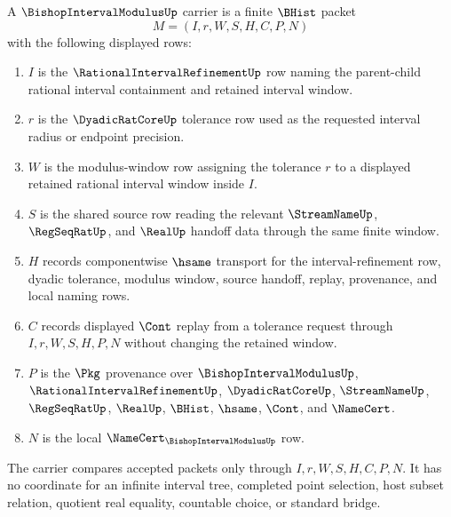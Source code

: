 \begin{definition}
\label{def:bishop-interval-modulus-carrier}
A $\BishopIntervalModulusUp$ carrier is a finite $\BHist$ packet
$$
M=(I,r,W,S,H,C,P,N)
$$
with the following displayed rows:
\begin{enumerate}
\item $I$ is the $\RationalIntervalRefinementUp$ row naming the parent-child rational interval containment and retained interval window.
\item $r$ is the $\DyadicRatCoreUp$ tolerance row used as the requested interval radius or endpoint precision.
\item $W$ is the modulus-window row assigning the tolerance $r$ to a displayed retained rational interval window inside $I$.
\item $S$ is the shared source row reading the relevant $\StreamNameUp$, $\RegSeqRatUp$, and $\RealUp$ handoff data through the same finite window.
\item $H$ records componentwise $\hsame$ transport for the interval-refinement row, dyadic tolerance, modulus window, source handoff, replay, provenance, and local naming rows.
\item $C$ records displayed $\Cont$ replay from a tolerance request through $I,r,W,S,H,P,N$ without changing the retained window.
\item $P$ is the $\Pkg$ provenance over $\BishopIntervalModulusUp$, $\RationalIntervalRefinementUp$, $\DyadicRatCoreUp$, $\StreamNameUp$, $\RegSeqRatUp$, $\RealUp$, $\BHist$, $\hsame$, $\Cont$, and $\NameCert$.
\item $N$ is the local $\NameCert_{\BishopIntervalModulusUp}$ row.
\end{enumerate}
The carrier compares accepted packets only through $I,r,W,S,H,C,P,N$. It has no coordinate for an infinite interval tree, completed point selection, host subset relation, quotient real equality, countable choice, or standard bridge.
\end{definition}

